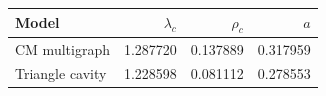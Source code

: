 \begin{tabular}{lrrr}
\toprule
Model & $\lambda_c$ & $\rho_c$ & $a$ \\
\midrule
CM multigraph & 1.287720 & 0.137889 & 0.317959 \\
Triangle cavity & 1.228598 & 0.081112 & 0.278553 \\
\bottomrule
\end{tabular}
